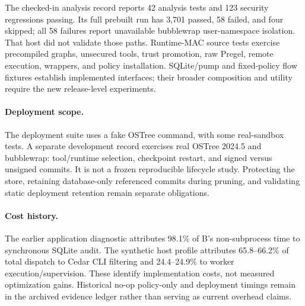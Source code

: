 The checked-in analysis record reports 42 analysis tests and 123 security
regressions passing. Its full prebuilt run has 3,701 passed, 58 failed, and four
skipped; all 58 failures report unavailable bubblewrap user-namespace isolation.
That host did not validate those paths. Runtime-MAC source tests exercise
precompiled graphs, unsecured tools, trust promotion, raw Pregel, remote
execution, wrappers, and policy installation. SQLite/pump and fixed-policy flow
fixtures establish implemented interfaces; their broader composition and utility
require the new release-level experiments.

\paragraph{Deployment scope.}
The deployment suite uses a fake OSTree command, with some real-sandbox tests.
A separate development record exercises real OSTree 2024.5 and bubblewrap:
tool/runtime selection, checkpoint restart, and signed versus unsigned commits.
It is not a frozen reproducible lifecycle study. Protecting the store, retaining
database-only referenced commits during pruning, and validating static deployment
retention remain separate obligations.

\paragraph{Cost history.}
The earlier application diagnostic attributes 98.1\% of B's non-subprocess
time to synchronous SQLite audit. The synthetic host profile attributes
65.8--66.2\% of total dispatch to Cedar CLI filtering and 24.4--24.9\% to
worker execution/supervision. These identify implementation costs, not measured
optimization gains. Historical no-op policy-only and deployment timings remain
in the archived evidence ledger rather than serving as current overhead claims.

